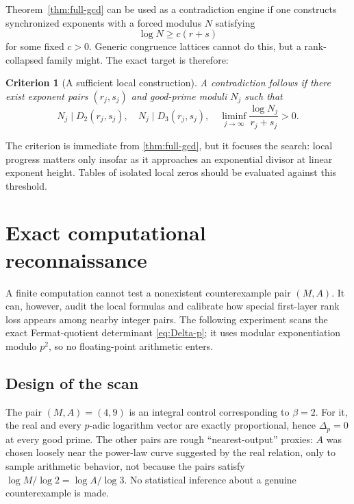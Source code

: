 \documentclass[11pt,oneside]{article}
\newtheorem{criterion}[theorem]{Criterion}
\theoremstyle{definition}
\begin{document}
Theorem~\ref{thm:full-gcd} can be used as a contradiction engine if one
constructs synchronized exponents with a forced modulus $N$ satisfying
\begin{equation}\label{eq:contradiction-engine}
  \log N\ge c(r+s)
\end{equation}
for some fixed $c>0$.  Generic congruence lattices cannot do this, but a
rank-collapsed family might.  The exact target is therefore:

\begin{criterion}[A sufficient local construction]\label{crit:sufficient-local}
A contradiction follows if there exist exponent pairs $(r_j,s_j)$ and
good-prime moduli $N_j$ such that
\begin{equation}\label{eq:sufficient-local}
  N_j\mid D_2(r_j,s_j),\quad N_j\mid D_3(r_j,s_j),\quad
  \liminf_{j\to\infty}\frac{\log N_j}{r_j+s_j}>0.
\end{equation}
\end{criterion}

The criterion is immediate from \cref{thm:full-gcd}, but it focuses the
search: local progress matters only insofar as it approaches an
exponential divisor at linear exponent height.  Tables of isolated local
zeros should be evaluated against this threshold.

\section{Exact computational reconnaissance}\label{sec:computation}

A finite computation cannot test a nonexistent counterexample pair
$(M,A)$.  It can, however, audit the local formulas and calibrate how
special first-layer rank loss appears among nearby integer pairs.  The
following experiment scans the exact Fermat-quotient determinant
\eqref{eq:Delta-p}; it uses modular exponentiation modulo $p^2$, so no
floating-point arithmetic enters.

\subsection{Design of the scan}

The pair $(M,A)=(4,9)$ is an integral control corresponding to $\beta=2$.
For it, the real and every $p$-adic logarithm vector are exactly
proportional, hence $\Delta_p=0$ at every good prime.  The other pairs are
rough ``nearest-output'' proxies: $A$ was chosen loosely near the power-law curve suggested by the real relation, only to
sample arithmetic behavior, not because the pairs satisfy
$\log M/\log2=\log A/\log3$.  No statistical inference about a genuine
counterexample is made.
\end{document}
